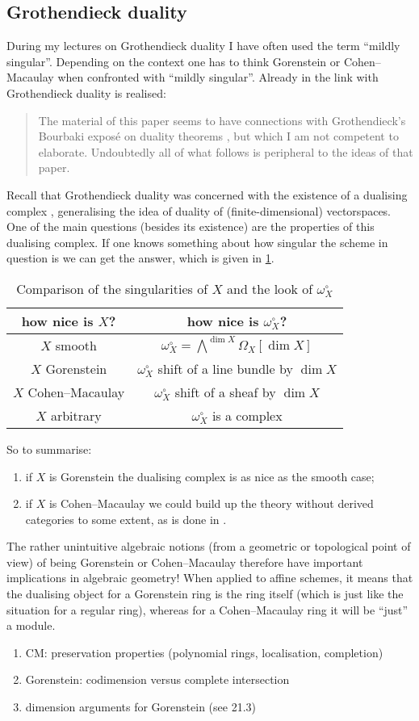 \documentclass[10pt,a4paper]{article}
\begin{document}
\subsection{Grothendieck duality}
During my lectures on Grothendieck duality I have often used the term ``mildly singular''. Depending on the context one has to think Gorenstein or Cohen--Macaulay when confronted with ``mildly singular''. Already in \cite{bass-ubiquity-gorenstein-rings} the link with Grothendieck duality is realised:
\begin{quote}
  The material of this paper seems to have connections with Grothendieck's Bourbaki expos\'e on duality theorems \cite{grothendieck-theoremes-de-dualite}, but which I am not competent to elaborate. Undoubtedly all of what follows is peripheral to the ideas of that paper.
\end{quote}
Recall that Grothendieck duality was concerned with the existence of a dualising complex \cite{hartshorne-residues-and-duality}, generalising the idea of duality of (finite-dimensional) vectorspaces. One of the main questions (besides its existence) are the properties of this dualising complex. If one knows something about how singular the scheme in question is we can get the answer, which is given in \cref{table:comparison-X-dualising-sheaf}.
\begin{table}[p]
  \centering
  \begin{tabular}{cc}
    \toprule
    how nice is $X$? & how nice is $\omega_X^\circ$? \\\midrule
    $X$ smooth & $\omega_X^\circ=\bigwedge^{\dim X}\Omega_X[\dim X]$ \\
    $X$ Gorenstein & $\omega_X^\circ$ shift of a line bundle by $\dim X$ \\
    $X$ Cohen--Macaulay & $\omega_X^\circ$ shift of a sheaf by $\dim X$ \\
    $X$ arbitrary & $\omega_X^\circ$ is a complex \\
    \bottomrule
  \end{tabular}
  \caption{Comparison of the singularities of $X$ and the look of $\omega_X^\circ$}
  \label{table:comparison-X-dualising-sheaf}
\end{table}
So to summarise:
\begin{enumerate}
  \item if $X$ is Gorenstein the dualising complex is as nice as the smooth case;
  \item if $X$ is Cohen--Macaulay we could build up the theory without derived categories to some extent, as is done in \cite{hartshorne-algebraic-geometry}.
\end{enumerate}
The rather unintuitive algebraic notions (from a geometric or topological point of view) of being Gorenstein or Cohen--Macaulay therefore have important implications in algebraic geometry! When applied to affine schemes, it means that the dualising object for a Gorenstein ring is the ring itself (which is just like the situation for a regular ring), whereas for a Cohen--Macaulay ring it will be ``just'' a module.


\begin{enumerate}
  \item CM: preservation properties (polynomial rings, localisation, completion)
  \item Gorenstein: codimension versus complete intersection
  \item dimension arguments for Gorenstein (see 21.3)
\end{enumerate}

\printbibliography
\end{document}
